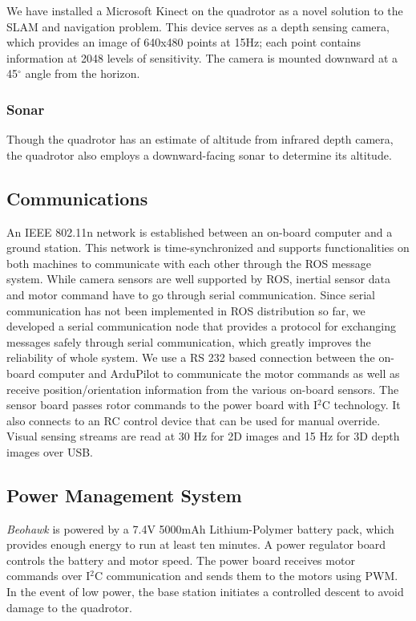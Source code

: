 \documentclass[12pt, letterpaper]{article}
\begin{document}
We have installed a Microsoft Kinect on the quadrotor as a novel solution to the SLAM and navigation problem. This device serves as a depth sensing camera, which provides an image of 640x480 points at 15Hz; each point contains information at 2048 levels of sensitivity. The camera is mounted downward at a 45$^\circ$ angle from the horizon.

\subsubsection{Sonar}

Though the quadrotor has an estimate of altitude from infrared depth camera, the quadrotor also employs a downward-facing sonar to determine its altitude.

\subsection{Communications}

An IEEE 802.11n network is established between an on-board computer and a ground station. This network is time-synchronized and supports functionalities on both machines to communicate with each other through the ROS message system. While camera sensors are well supported by ROS, inertial sensor data and motor command have to go through serial communication. Since serial communication has not been implemented in ROS distribution so far, we developed a serial communication node that provides a protocol for exchanging messages safely through serial communication, which greatly improves the reliability of whole system. We use a RS 232 based connection between the on-board computer and ArduPilot to communicate the motor commands as well as receive position/orientation information from the various on-board sensors. The sensor board passes rotor commands to the power board with I$^2$C technology. It also connects to an RC control device that can be used for manual override. Visual sensing streams are read at 30 Hz for 2D images and 15 Hz for 3D depth images over USB.

\subsection{Power Management System}

\textit{Beohawk} is powered by a 7.4V 5000mAh Lithium-Polymer battery pack, which provides enough energy to run at least ten minutes. A power regulator board controls the battery and motor speed. The power board receives motor commands over I$^2$C communication and sends them to the motors using PWM. In the event of low power, the base station initiates a controlled descent to avoid damage to the quadrotor.
\end{document}
